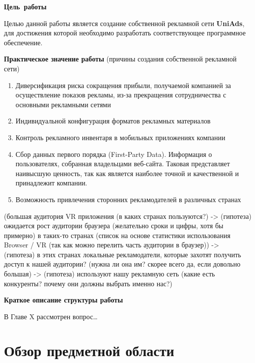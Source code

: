 \documentclass[specification,annotation,times]{itmo-student-thesis}
\begin{document}
\bigbreak
{\large \textbf{Цель работы}}
\bigbreak

Целью данной работы является создание собственной рекламной сети \textbf{UniAds}, для достижения которой необходимо разработать соответствующее программное обеспечение.
\bigbreak

\bigbreak
{\large \textbf{Практическое значение работы}} (причины создания собственной рекламной сети)
\bigbreak

\begin{enumerate}
	\item Диверсификация риска сокращения прибыли, получаемой компанией за осуществление показов рекламы, из-за прекращения сотрудничества с основными рекламными сетями
	\item Индивидуальной конфигурация форматов рекламных материалов
	\item Контроль рекламного инвентаря в мобильных приложениях компании
	\item Сбор данных первого порядка (First-Party Data). Информация о пользователях, собранная владельцами веб-сайта. Таковая представляет наивысшую ценность, так как является наиболее точной и качественной и принадлежит компании.
	\item Возможность привлечения сторонних рекламодателей в различных странах
\end{enumerate}
\bigbreak

(большая аудитория VR приложения (в каких странах пользуются?) -> (гипотеза) ожидается рост аудитории браузера (желательно сроки и цифры, хотя бы примерно) в таких-то странах (список на основе статистики использования Browser / VR (так как можно перелить часть аудитории в браузер)) -> (гипотеза) в этих странах локальные рекламодатели, которые захотят получить доступ к нашей аудитории? (нужна ли она им? скорее всего да, если довольно большая) -> (гипотеза) используют нашу рекламную сеть (какие есть конкуренты? почему они должны выбрать именно нас?)
\bigbreak

\bigbreak
{\large \textbf{Краткое описание структуры работы}}
\bigbreak

В Главе X рассмотрен вопрос…








\chapter{Обзор предметной области}
\end{document}
